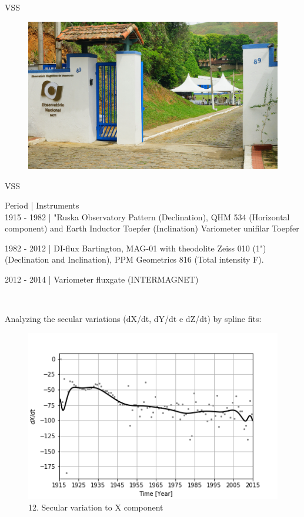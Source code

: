\documentclass[final,t]{beamer}
\begin{document}
\begin{columns}[t]
\begin{column}{.33\linewidth}
\begin{block}{VSS}
	\justifying
\begin{figure}
\centering
\includegraphics[width=0.8\linewidth]{OMV_JOELSONMOREIRA}
\caption{}
\label{fig:OMV_JOELSONMOREIRA}
\end{figure}





\end{block}


\begin{block}{VSS}
\centering

	 Period |\hspace{2.0cm}  Instruments   \\ 
	 
	 1915 - 1982 | "Ruska Observatory Pattern (Declination), QHM 534 (Horizontal component) and Earth Inductor Toepfer (Inclination) Variometer unifilar Toepfer 
	 
	 1982 - 2012 | DI-flux Bartington, MAG-01 with theodolite Zeiss 010 (1") (Declination and Inclination), PPM Geometrics 816 (Total intensity F).
	 
	 2012 - 2014 | Variometer fluxgate (INTERMAGNET)


\\

	
\end{block}



\begin{block}{}
	
	Analyzing the secular variations (dX/dt, dY/dt e dZ/dt) by spline fits: 		
	\begin{figure}
		\centering
		\includegraphics[width=0.7\linewidth]{spline101sv_X_spline}
		\caption{12. Secular variation to X component}
		\label{SPLINEx}
	\end{figure}
	

\end{block}
\end{column}
\end{columns}
\end{document}
